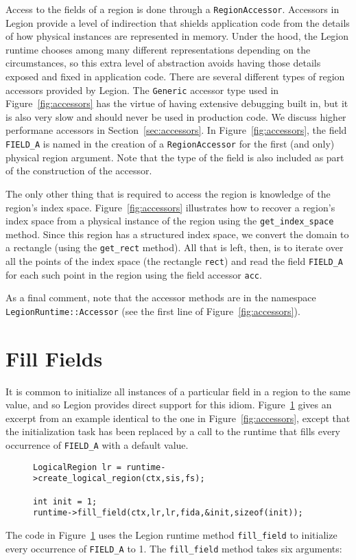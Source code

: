 Access to the fields of a region is done through a {\tt RegionAccessor}.  Accessors in Legion provide a level of indirection
that shields application code from the details of how physical instances  are represented in memory.  Under the hood, 
the Legion runtime chooses among many different representations depending on the circumstances, so this extra level
of abstraction avoids having those details exposed and fixed in application code.  There are several different types of
region accessors provided by Legion.  The {\tt Generic} accessor type used in Figure~\ref{fig:accessors} has the virtue of having
extensive debugging built in, but it is also very slow and should never be used in production code.  We discuss higher
performane accessors in Section~\ref{sec:accessors}.
In Figure~\ref{fig:accessors}, the field
{\tt FIELD\_A} is named in the creation of a {\tt RegionAccessor} for the first (and only) physical region argument.
Note that the type of the field is also included as part of the construction of the accessor.

The only other thing that is required to access the region is knowledge of the region's index space.  Figure~\ref{fig:accessors}
illustrates how to recover a region's index space from a physical instance of the region using the {\tt get\_index\_space} method.
Since this region has a structured index space, we convert the domain to a rectangle (using the {\tt get\_rect} method).
All that is left, then, is to iterate over all the points of the index space (the rectangle {\tt rect}) and read the
field {\tt FIELD\_A} for each such point in the region using the field accessor {\tt acc}.

As a final comment, note that the accessor methods are in the namespace {\tt LegionRuntime::Accessor} (see the first line
of Figure~\ref{fig:accessors}).

\section{Fill Fields}
\label{sec:fill}

It is common to initialize all instances of a particular field in a region to the same value, and so Legion
provides direct support for this idiom.  Figure~\ref{fig:fill} gives an excerpt from an example identical
to the one in Figure~\ref{fig:accessors}, except that the initialization task has been replaced by a call to
the runtime that fills every occurrence of {\tt FIELD\_A} with a default value.

\begin{figure}
{\small
\begin{lstlisting}
LogicalRegion lr = runtime->create_logical_region(ctx,sis,fs);

int init = 1;
runtime->fill_field(ctx,lr,lr,fida,&init,sizeof(init));
\end{lstlisting}
}
\caption{}
\label{fig:fill}
\end{figure}
The code in Figure~\ref{fig:fill} uses the Legion runtime method {\tt fill\_field} to initialize every 
occurrence of {\tt FIELD\_A} to 1.  The {\tt fill\_field} method takes six arguments:

